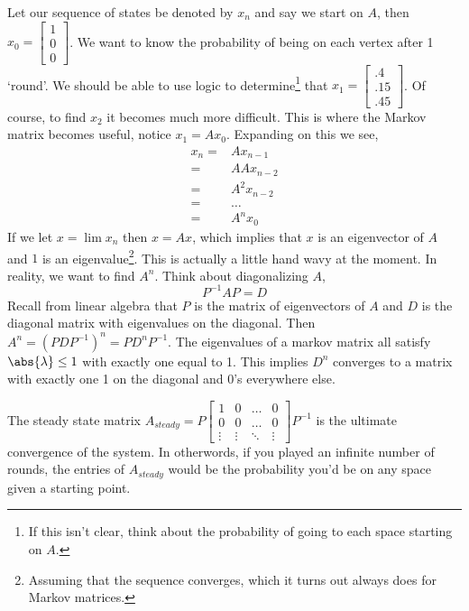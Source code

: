 \documentclass[11pt,letterpaper]{article}
\begin{document}
Let our sequence of states be denoted by $x_n$ and say we start on $A$, then $x_0 = \begin{bmatrix} 1 \\ 0 \\ 0\end{bmatrix}$. We want to know the probability of being on each vertex after 1 `round'. We should be able to use logic to determine\footnote{If this isn't clear, think about the probability of going to each space starting on $A$.} that $x_1 = \begin{bmatrix} .4 \\ .15 \\ .45 \end{bmatrix}$. Of course, to find $x_2$ it becomes much more difficult. This is where the Markov matrix becomes useful, notice $x_1 = Ax_0$. Expanding on this we see,
\begin{align*}
 x_n = & Ax_{n-1} \\
  = & AAx_{n-2} \\
  = & A^2x_{n-2} \\
  = & \dots \\
  = & A^n x_0
\end{align*}
If we let $x=\lim x_n$ then $x = Ax$, which implies that $x$ is an eigenvector of $A$ and $1$ is an eigenvalue\footnote{Assuming that the sequence converges, which it turns out always does for Markov matrices.}. This is actually a little hand wavy at the moment. In reality, we want to find $A^n$. Think about diagonalizing $A$, 
\[
P^{-1}AP = D
\]
Recall from linear algebra that $P$ is the matrix of eigenvectors of $A$ and $D$ is the diagonal matrix with eigenvalues on the diagonal. Then $A^n = (PDP^{-1})^n = P D^n P^{-1}$. The eigenvalues of a markov matrix all satisfy $\abs{\lambda}\le 1$ with exactly one equal to 1. This implies $D^n$ converges to a matrix with exactly one 1 on the diagonal and 0's everywhere else. 

The steady state matrix $A_{steady} = P \begin{bmatrix} 1 & 0 & \dots & 0 \\ 0 & 0 & \dots & 0 \\ \vdots & \vdots &\ddots &\vdots \end{bmatrix}P^{-1}$ is the ultimate convergence of the system. In otherwords, if you played an infinite number of rounds, the entries of $A_{steady}$ would be the probability you'd be on any space given a starting point. 



\newpage
\end{document}
